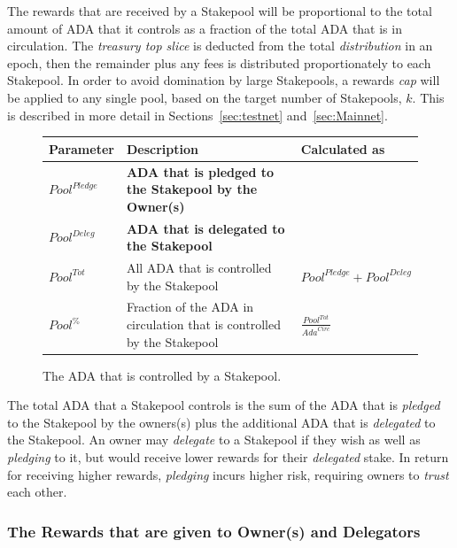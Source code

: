 \documentclass[11pt,a4paper,dvipsnames,twosided,final]{article}
\newcommand{\khcomment}[1]{\todo[color=blue!20]{KH: #1}}
\newcommand{\ada}{ADA{}}
\begin{document}
The rewards that are received by a Stakepool will be proportional to the total amount of \ada{} that it controls
as a fraction of the total \ada{} that is in circulation.  The \emph{treasury top slice} is deducted from the total \emph{distribution}
in an epoch, then the remainder plus any fees is distributed proportionately to each Stakepool.  In order to avoid domination by large Stakepools,
a rewards \emph{cap} will be applied to any single pool, based on the target number of Stakepools, $k$.
This is described in more detail in Sections~\ref{sec:testnet} and~\ref{sec:Mainnet}.

\clearpage
\begin{figure}[h!]
\begin{center}
\begin{tabular}{||l|p{9cm}|l||}
  \hline \hline
\textbf{Parameter} & \textbf{Description} & \textbf{Calculated as} \\\hline
\textbf{\color{red} ${\textit{Pool}}^\textit{Pledge}$} & \textbf{\color{red} \ada{} that is pledged to the Stakepool by the Owner(s)} & \\\hline
\textbf{\color{blue} ${\textit{Pool}}^\textit{Deleg}$} & \textbf{\color{blue}  \ada{} that is delegated to the Stakepool} & \\\hline
${\textit{Pool}}^{Tot}$ & All \ada{} that is controlled by the Stakepool & ${\textit{Pool}}^\textit{Pledge} + {\textit{Pool}}^\textit{Deleg}$ \\\hline
${\textit{Pool}}^\%$ & Fraction of the \ada{} in circulation that is controlled by the Stakepool & {\large $\frac{{\textit{Pool}}^{Tot}}{\textit{Ada}^{\textit{Circ}}}$} \\\hline
  \hline
\end{tabular}
\end{center}
\caption{The \ada{} that is controlled by a Stakepool.}
\end{figure}

\noindent
The total \ada{} that a Stakepool controls is the sum of the \ada{} that is \emph{pledged} to the Stakepool by the owners(s) plus
the additional \ada{} that is \emph{delegated} to the Stakepool.  An owner may \emph{delegate} to a Stakepool if
they wish as well as \emph{pledging} to it, but would receive lower rewards for their \emph{delegated} stake.
In return for receiving higher rewards, \emph{pledging} incurs higher risk, requiring owners to \emph{trust} each other.


\subsubsection*{The Rewards that are given to Owner(s) and Delegators}
\end{document}
